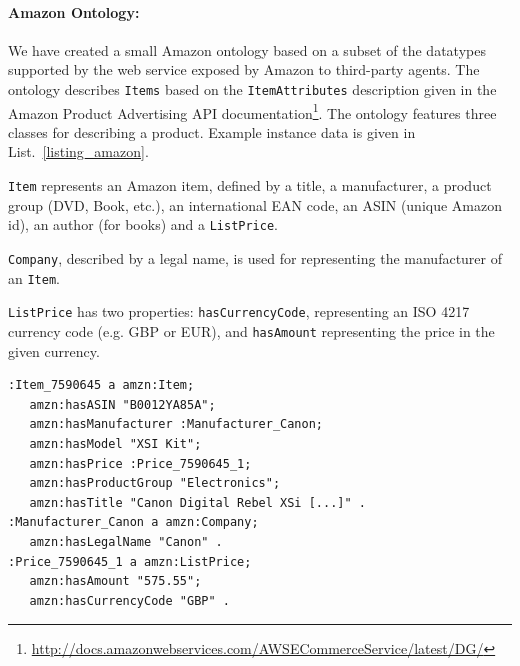 \paragraph{Amazon Ontology:}
We have created a small Amazon ontology based on a subset of the datatypes supported by the web service exposed by Amazon to third-party agents. The ontology describes \texttt{Items} based on the \texttt{ItemAttributes} description given in the Amazon Product Advertising API documentation\footnote{\url{http://docs.amazonwebservices.com/AWSECommerceService/latest/DG/}}.
The ontology features three classes for describing a product. Example instance data is given in List.~\ref{listing_amazon}.
\begin{inparaenum}[(1)]
    \item \texttt{Item} represents an Amazon item, defined by a title, a manufacturer, a product group (DVD, Book, etc.), an international EAN code, an ASIN (unique Amazon id), an author (for books) and a \texttt{ListPrice}. 
    \item \texttt{Company}, described by a  legal name, is used for representing the manufacturer of an \texttt{Item}.
    \item \texttt{ListPrice} has two properties: \texttt{hasCurrencyCode}, representing an ISO 4217 currency code (e.g. GBP or EUR), and \texttt{hasAmount} representing the price in the given currency.
\end{inparaenum}


\lstset{caption=Simplified Amazon ontology data in N3 notation, label=listing_amazon}
\lstset{language=turtle}
\begin{lstlisting}
:Item_7590645 a amzn:Item;
   amzn:hasASIN "B0012YA85A";
   amzn:hasManufacturer :Manufacturer_Canon;
   amzn:hasModel "XSI Kit";
   amzn:hasPrice :Price_7590645_1;
   amzn:hasProductGroup "Electronics";
   amzn:hasTitle "Canon Digital Rebel XSi [...]" .
:Manufacturer_Canon a amzn:Company;
   amzn:hasLegalName "Canon" .
:Price_7590645_1 a amzn:ListPrice;
   amzn:hasAmount "575.55";
   amzn:hasCurrencyCode "GBP" .
\end{lstlisting}


